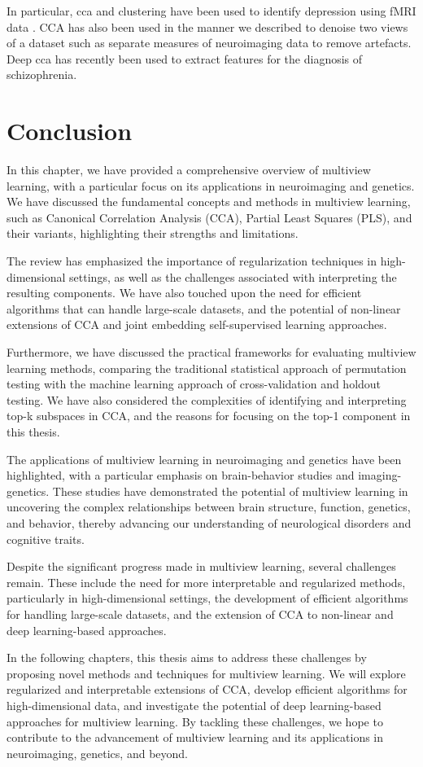 In particular, \acrshort{cca} and clustering have been used to identify depression using fMRI data \citep{dinga2019evaluating,drysdale2017resting}.
CCA has also been used in the manner we described to denoise two \gls{views} of a dataset such as separate measures of neuroimaging data \citep{zhuang2020technical} to remove artefacts.
Deep \acrshort{cca} has recently been used to extract features for the diagnosis of schizophrenia\citep{qi2016deep}.

\section{Conclusion}

In this chapter, we have provided a comprehensive overview of multiview learning, with a particular focus on its applications in neuroimaging and genetics. We have discussed the fundamental concepts and methods in multiview learning, such as Canonical Correlation Analysis (CCA), Partial Least Squares (PLS), and their variants, highlighting their strengths and limitations.

The review has emphasized the importance of regularization techniques in high-dimensional settings, as well as the challenges associated with interpreting the resulting components. We have also touched upon the need for efficient algorithms that can handle large-scale datasets, and the potential of non-linear extensions of CCA and joint embedding self-supervised learning approaches.

Furthermore, we have discussed the practical frameworks for evaluating multiview learning methods, comparing the traditional statistical approach of permutation testing with the machine learning approach of cross-validation and holdout testing. We have also considered the complexities of identifying and interpreting top-k subspaces in CCA, and the reasons for focusing on the top-1 component in this thesis.

The applications of multiview learning in neuroimaging and genetics have been highlighted, with a particular emphasis on brain-behavior studies and imaging-genetics. These studies have demonstrated the potential of multiview learning in uncovering the complex relationships between brain structure, function, genetics, and behavior, thereby advancing our understanding of neurological disorders and cognitive traits.

Despite the significant progress made in multiview learning, several challenges remain. These include the need for more interpretable and regularized methods, particularly in high-dimensional settings, the development of efficient algorithms for handling large-scale datasets, and the extension of CCA to non-linear and deep learning-based approaches.

In the following chapters, this thesis aims to address these challenges by proposing novel methods and techniques for multiview learning. We will explore regularized and interpretable extensions of CCA, develop efficient algorithms for high-dimensional data, and investigate the potential of deep learning-based approaches for multiview learning. By tackling these challenges, we hope to contribute to the advancement of multiview learning and its applications in neuroimaging, genetics, and beyond.
